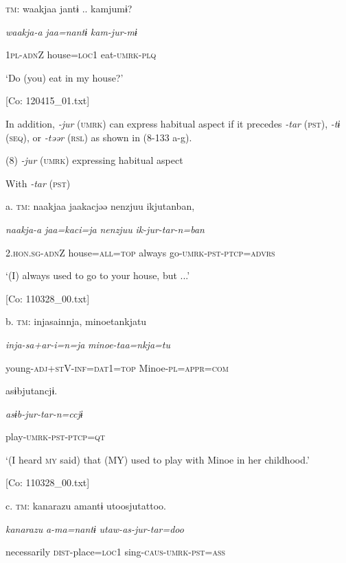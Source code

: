   \textsc{tm}:  waakjaa  jantɨ ..  kamjumɨ?

    \textit{waakja-a}  \textit{jaa=nantɨ}  \textit{kam-jur-mɨ}

    1\textsc{pl}-\textsc{adn}Z  house=\textsc{loc}1  eat-\textsc{umrk}-\textsc{plq}

    ‘Do (you) eat in my house?’

    [Co: 120415\_01.txt]

  In addition, \textit{{}-jur} (\textsc{umrk}) can express habitual aspect if it precedes \textit{{}-tar} (\textsc{pst}), \textit{{}-tɨ} (\textsc{seq}), or \textit{{}-təər} (\textsc{rsl}) as shown in (8-133 a-g).

(8)  \textit{{}-jur} (\textsc{umrk}) expressing habitual aspect

  With \textit{{}-tar} (\textsc{pst})

  a.  \textsc{tm}:  naakjaa  jaakacjəə  {\textbar}nenzjuu{\textbar}  ikjutanban,

      \textit{naakja-a}  \textit{jaa=kaci=ja}  \textit{nenzjuu}  \textit{ik-jur-tar{}-n=ban}

      2.\textsc{hon}.\textsc{sg}-\textsc{adn}Z  house=\textsc{all}=\textsc{top}  always  go-\textsc{umrk}-\textsc{pst}-\textsc{ptcp}=\textsc{advrs}

      ‘(I) always used to go to your house, but ...’

      [Co: 110328\_00.txt]

  b.  \textsc{tm}:  injasainnja,  minoetankjatu

      \textit{inja-sa+ar-i=n=ja}  \textit{minoe-taa=nkja=tu}

      young-\textsc{adj}+\textsc{st}V-\textsc{inf}=\textsc{dat}1=\textsc{top}  Minoe-\textsc{pl}=\textsc{appr}=\textsc{com}

      asɨbjutancjɨ.

      \textit{asɨb-jur-tar{}-n=ccjɨ}

      play-\textsc{umrk}-\textsc{pst}-\textsc{ptcp}=\textsc{qt}

      ‘(I heard \textsc{my} said) that (MY) used to play with Minoe in her childhood.’

      [Co: 110328\_00.txt]

  c.  \textsc{tm}:  {\textbar}kanarazu{\textbar}  amantɨ  utoosjutattoo.

      \textit{kanarazu}  \textit{a-ma=nantɨ}  \textit{utaw-as-jur-tar=doo}

      necessarily  \textsc{dist}-place=\textsc{loc}1  sing-\textsc{caus}-\textsc{umrk}-\textsc{pst}=\textsc{ass}

